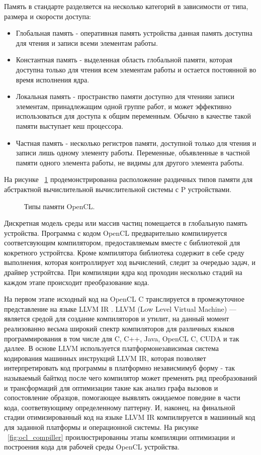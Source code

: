 Память в стандарте разделяется на несколько категорий в зависимости от типа, размера и скорости доступа:

\begin{itemize}
  \item Глобальная память - оперативная память устройства данная память доступна для чтения и записи всеми элементам работы.
  \item Константная память - выделенная область  глобальной  памяти, которая  доступна только для чтения всем элементам работы и остается постоянной во время исполнения ядра.
  \item Локальная память - пространство памяти доступно для чтенияи записи элементам, принадлежащим одной группе работ, и может эффективно использоваться для доступа к общим переменным. Обычно в качестве такой памяти выступает кеш процессора.
  \item Частная память - несколько регистров памяти, доступной только для чтения и записи лишь одному элементу работы. Переменные, объявленные в частной памяти одного элемента работы, не видимы для другого элемента работы.
\end{itemize}
На рисунке ~\ref{fig:ocl_memory} продемонстрированна расположение раздичных типов памяти для абстрактной вычислительной вычислительной системы с P устройствами.

\begin{figure}[ht]
  \caption{Типы памяти OpenCL.}\label{fig:ocl_memory}
\end{figure}

Дискретная модель среды или массив частиц помещается в глобальную память устройства. Программа с кодом OpenCL предварительно компилируется соответсвующим компилятором, предоставляемым вместе с библиотекой для кокретного устройтсва. Кроме компилятора библиотека содержит в себе среду выполнения, которая контроллирует ход вычислений, следит за очередью задач, и драйвер устройтсва. При компиляции ядра код проходин несколько стадий \cite{Hong2014} на каждом этапе происходит преобразование кода.

На первом этапе исходный код на OpenCL C транслируется в промежуточное представление на языке LLVM IR \cite{Lattner2004, Lattner2002}. LLVM (Low Level Virtual Machine) — является средой для создание компиляторов и утилит, на данный момент реализованно весьма широкий спектр компиляторов для различных языков программирования в том числе для C, C++, Java, OpenCL C, CUDA и так даллее. В основе LLVM используется платформонезависимая система кодирования машинных инструкций LLVM IR, которая позволяет интерпретировать код программы в платформно независмимуб форму - так называемый байткод после чего компилятор может пременять ряд преобразований и трансформаций для оптимизации такие как анализ графа вызовов и сопостовление образцов, помогающее выявлять ожидаемое поведние в части кода, соответвующиму определенному паттерну. И, наконец, на финальной стадии отимизированный код на языке LLVM IR компилируется в машинный код для заданной платформы и операционной системы.
На рисунке ~\ref{fig:ocl_compiller} проилюстрированны этапы компиляции оптимизации и построения кода для рабочей среды OpenCL устройства.

